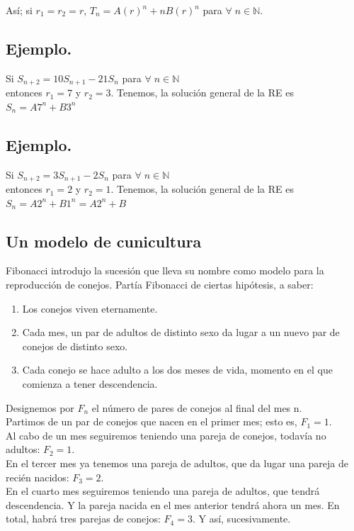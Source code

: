 \documentclass{article}
\begin{document}
Así; si $r_1 = r_2 = r$, $T_n = A(r)^n + nB(r)^n$ para $\forall \; n \in \mathbb{N}$.
 
 \subsection{Ejemplo.}
 Si $S_{n+2} = 10S_{n+1} - 21S_n$ para $\forall \; n \in \mathbb{N}$\\
 entonces $r_1 = 7$ y $r_2 = 3$. Tenemos, la solución general de la RE es $S_n= A 7^n + B 3^{n}$
 
 \subsection{Ejemplo.}
Si $S_{n+2} = 3S_{n+1} - 2S_n$ para $\forall \; n \in \mathbb{N}$\\
 entonces $r_1 =2$ y $r_2 = 1$. Tenemos, la solución general de la RE es $S_n= A 2^n + B 1^{n} = A2^n + B$\\

\newpage
\subsection{Un modelo de cunicultura}

Fibonacci introdujo la sucesión que lleva su nombre como modelo para la reproducción de conejos. Partía Fibonacci de ciertas hipótesis, a saber:
\begin{enumerate}
    \item Los conejos viven eternamente.
    \item Cada mes, un par de adultos de distinto sexo da lugar a un nuevo par de conejos de distinto sexo.
    \item Cada conejo se hace adulto a los dos meses de vida, momento en el que comienza a tener descendencia.
\end{enumerate}
Designemos por $F_n$ el número de pares de conejos al final del mes n.\\
Partimos de un par de conejos que nacen en el primer mes; esto es, $F_1=1$.\\
Al cabo de un mes seguiremos teniendo una pareja de conejos, todavía no adultos: $F_2=1$.\\
En el tercer mes ya tenemos una pareja de adultos, que da lugar una pareja de recién nacidos: $F_3=2$.\\
En el cuarto mes seguiremos teniendo una pareja de adultos, que tendrá descendencia. Y la pareja nacida en el mes anterior tendrá ahora un mes. En total, habrá tres parejas de conejos: $F_4=3$. Y así, sucesivamente.\\\\
\end{document}
